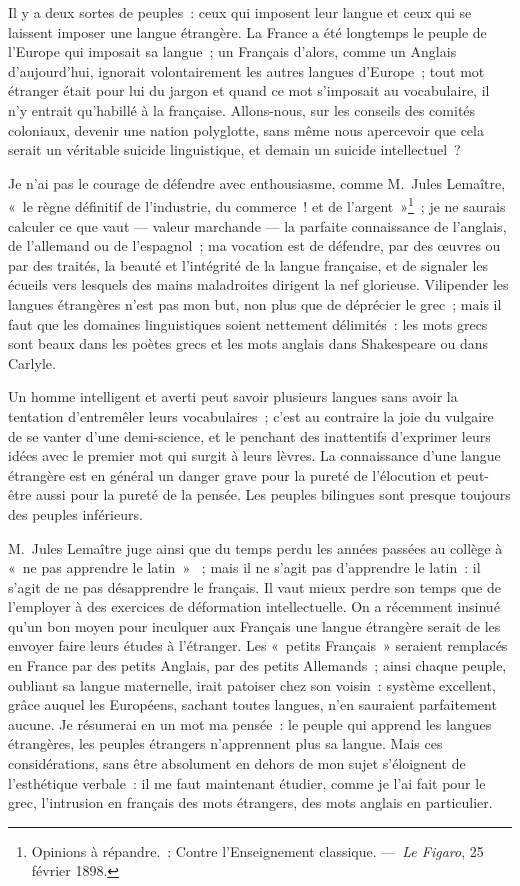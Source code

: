 \documentclass[french,twoside]{book} %
\newcommand\chapterclose{} %
\begin{document}
Il y a deux sortes de peuples : ceux qui imposent leur langue et ceux qui se laissent imposer une langue étrangère. La France a été longtemps le peuple de l’Europe qui imposait sa langue ; un Français d’alors, comme un Anglais d’aujourd’hui, ignorait volontairement les autres langues d’Europe ; tout mot étranger était pour lui du jargon et quand ce mot s’imposait au vocabulaire, il n’y entrait qu’habillé à la française. Allons-nous, sur les conseils des comités coloniaux, devenir une nation polyglotte, sans même nous apercevoir que cela serait un véritable suicide linguistique, et demain un suicide intellectuel ?\par
Je n’ai pas le courage de défendre avec enthousiasme, comme M. Jules Lemaître, « le règne définitif de l’industrie, du commerce ! et de l’argent »\footnote{Opinions à répandre. : Contre l’Enseignement classique. — {\itshape Le Figaro}, 25 février 1898.} ; je ne saurais calculer ce que vaut — valeur marchande — la parfaite connaissance de l’anglais, de l’allemand ou de l’espagnol ; ma vocation est de défendre, par des œuvres ou par des traités, la beauté et l’intégrité de la langue française, et de signaler les écueils vers lesquels des mains maladroites dirigent la nef glorieuse. Vilipender les langues étrangères n’est pas mon but, non plus que de déprécier le grec ; mais il faut que les domaines linguistiques soient nettement délimités : les mots grecs sont beaux dans les poètes grecs et les mots anglais dans Shakespeare ou dans Carlyle.\par
Un homme intelligent et averti peut savoir plusieurs langues sans avoir la tentation d’entremêler leurs vocabulaires ; c’est au contraire la joie du vulgaire de se vanter d’une demi-science, et le penchant des inattentifs d’exprimer leurs idées avec le premier mot qui surgit à leurs lèvres. La connaissance d’une langue étrangère est en général un danger grave pour la pureté de l’élocution et peut-être aussi pour la pureté de la pensée. Les peuples bilingues sont presque toujours des peuples inférieurs.\par
M. Jules Lemaître juge ainsi que du temps perdu les années passées au collège à « ne pas apprendre le latin »  ; mais il ne s’agit pas d’apprendre le latin : il s’agit de ne pas désapprendre le français. Il vaut mieux perdre son temps que de l’employer à des exercices de déformation intellectuelle. On a récemment insinué qu’un bon moyen pour inculquer aux Français une langue étrangère serait de les envoyer faire leurs études à l’étranger. Les « petits Français » seraient remplacés en France par des petits Anglais, par des petits Allemands ; ainsi chaque peuple, oubliant sa langue maternelle, irait patoiser chez son voisin : système excellent, grâce auquel les Européens, sachant toutes langues, n’en sauraient parfaitement aucune. Je résumerai en un mot ma pensée : le peuple qui apprend les langues étrangères, les peuples étrangers n’apprennent plus sa langue. Mais ces considérations, sans être absolument en dehors de mon sujet s’éloignent de l’esthétique verbale : il me faut maintenant étudier, comme je l’ai fait pour le grec, l’intrusion en français des mots étrangers, des mots anglais en particulier.
\chapterclose
\end{document}
